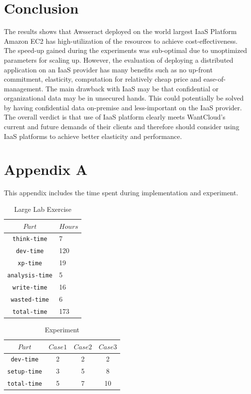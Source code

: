 \documentclass[conference]{IEEEtran}
\begin{document}
\section{Conclusion}
The results shows that Awsseract deployed on the world largest IaaS Platform Amazon EC2 has high-utilization of the resources to achieve cost-effectiveness. The speed-up gained during the experiments was sub-optimal due to unoptimized parameters for scaling up. However, the evaluation of deploying a distributed application on an IaaS provider has many benefits such as no up-front commitment, elasticity, computation for relatively cheap price and ease-of-management. The main drawback with IaaS may be that confidential or organizational data may be in unsecured hands. This could potentially be solved by having confidential data on-premise and less-important on the IaaS provider. The overall verdict is that use of IaaS platform clearly meets WantCloud's current and future demands of their clients and therefore should consider using IaaS platforms to achieve better elasticity and performance. 




\section{Appendix A}
This appendix includes the time spent during implementation and experiment. 

\begin{table}[h]
\renewcommand{\arraystretch}{1.3}
\caption{Large Lab Exercise}\label{tab:exe}
\centering
\begin{tabular*}{4cm}{c|p{5cm}}
    \hline
    $Part$&$Hours$\\
    \hline
    \texttt{think-time} & 7 \\
    \texttt{dev-time} & 120 \\
    \texttt{xp-time} & 19 \\
    \texttt{analysis-time} & 5 \\
    \texttt{write-time} & 16 \\
    \texttt{wasted-time} & 6 \\
    \hline \hline
    \texttt{total-time} & 173 \\
    \hline
\end{tabular*}
\end{table}

\begin{table}[h]
\renewcommand{\arraystretch}{1.3}
\caption{Experiment }\label{tab:xp}
\centering
\begin{tabular*}{5.5cm}{c|c|c|c}
    \hline
    $Part$&$Case1$&$Case2$&$Case3$\\
    \hline
    \texttt{dev-time} &2 &2 &2  \\
    \texttt{setup-time} &3 &5 &8 \\
    \hline \hline
    \texttt{total-time} &5 &7 &10 \\
    \hline
\end{tabular*}
\end{table}
\end{document}
